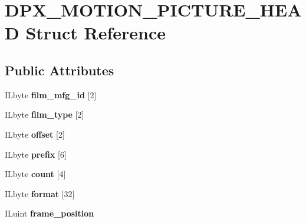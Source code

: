 \hypertarget{structDPX__MOTION__PICTURE__HEAD}{}\section{D\+P\+X\+\_\+\+M\+O\+T\+I\+O\+N\+\_\+\+P\+I\+C\+T\+U\+R\+E\+\_\+\+H\+E\+AD Struct Reference}
\label{structDPX__MOTION__PICTURE__HEAD}
\subsection*{Public Attributes}
\begin{DoxyCompactItemize}
\item 
\mbox{\label{structDPX__MOTION__PICTURE__HEAD_a79aeeb32ab126a957ca76c32ad68671a}} 
I\+Lbyte {\bfseries film\+\_\+mfg\+\_\+id} \mbox{[}2\mbox{]}
\item 
\mbox{\label{structDPX__MOTION__PICTURE__HEAD_a93dfa5cd897f05cfa2eddbb1e61847d9}} 
I\+Lbyte {\bfseries film\+\_\+type} \mbox{[}2\mbox{]}
\item 
\mbox{\label{structDPX__MOTION__PICTURE__HEAD_a1d03bc75cd6e8a0f20717717b93ada87}} 
I\+Lbyte {\bfseries offset} \mbox{[}2\mbox{]}
\item 
\mbox{\label{structDPX__MOTION__PICTURE__HEAD_ac55d2202b5281dbef0e4f32c7feb5462}} 
I\+Lbyte {\bfseries prefix} \mbox{[}6\mbox{]}
\item 
\mbox{\label{structDPX__MOTION__PICTURE__HEAD_a79931a442f1f5ed4c3b44690f13e0789}} 
I\+Lbyte {\bfseries count} \mbox{[}4\mbox{]}
\item 
\mbox{\label{structDPX__MOTION__PICTURE__HEAD_a68512f7e371071013d0f501a25e4f9e6}} 
I\+Lbyte {\bfseries format} \mbox{[}32\mbox{]}
\item 
\mbox{\label{structDPX__MOTION__PICTURE__HEAD_ab8cfd000b8bde5c640cfed52a43ebb2d}} 
I\+Luint {\bfseries frame\+\_\+position}
\item 

\end{DoxyCompactItemize}
